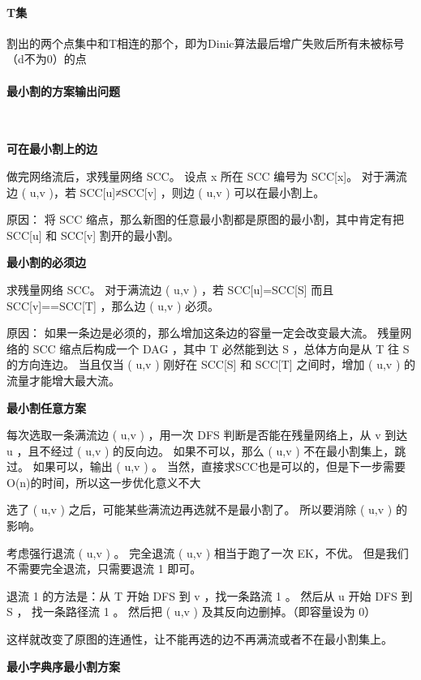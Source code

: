\documentclass[a4paper,11pt]{article}
\begin{document}
     \paragraph{T集}割出的两个点集中和T相连的那个，即为Dinic算法最后增广失败后所有未被标号（d不为0）的点
     \paragraph{最小割的方案输出问题}
     \ 
     
     \textbf{可在最小割上的边}
     
     做完网络流后，求残量网络 SCC。 
     设点 x 所在 SCC 编号为 SCC[x]。 
     对于满流边 ( u,v )，若 SCC[u]≠SCC[v]
     ，则边 ( u,v ) 可以在最小割上。
     
     原因： 将 SCC 缩点，那么新图的任意最小割都是原图的最小割，其中肯定有把 SCC[u] 和 SCC[v] 割开的最小割。
     
     \textbf{最小割的必须边}
     
     求残量网络 SCC。 
     对于满流边 ( u,v ) ，若 SCC[u]=SCC[S] 而且 SCC[v]==SCC[T] ，那么边 ( u,v ) 必须。
     
     原因： 如果一条边是必须的，那么增加这条边的容量一定会改变最大流。 
     残量网络的 SCC 缩点后构成一个 DAG ，其中 T 必然能到达 S ，总体方向是从 T 往 S 的方向连边。 
     当且仅当 ( u,v ) 刚好在 SCC[S] 和 SCC[T] 之间时，增加 ( u,v ) 的流量才能增大最大流。
     
     \textbf{最小割任意方案}
     
     每次选取一条满流边 ( u,v ) ，用一次 DFS 判断是否能在残量网络上，从 v 到达 u ，且不经过 ( u,v ) 的反向边。 
     如果不可以，那么 ( u,v ) 不在最小割集上，跳过。 
     如果可以，输出 ( u,v ) 。 
     当然，直接求SCC也是可以的，但是下一步需要O(n)的时间，所以这一步优化意义不大
     
     选了 ( u,v ) 之后，可能某些满流边再选就不是最小割了。 
     所以要消除 ( u,v ) 的影响。
     
     考虑强行退流 ( u,v ) 。 
     完全退流 ( u,v ) 相当于跑了一次 EK，不优。 
     但是我们不需要完全退流，只需要退流 1 即可。
     
     退流 1 的方法是：从 T 开始 DFS 到 v ，找一条路流 1 。 
     然后从 u 开始 DFS 到 S ， 找一条路径流 1 。 
     然后把 ( u,v ) 及其反向边删掉。（即容量设为 0）
     
     这样就改变了原图的连通性，让不能再选的边不再满流或者不在最小割集上。
     
     \textbf{最小字典序最小割方案}
     
\end{document}
